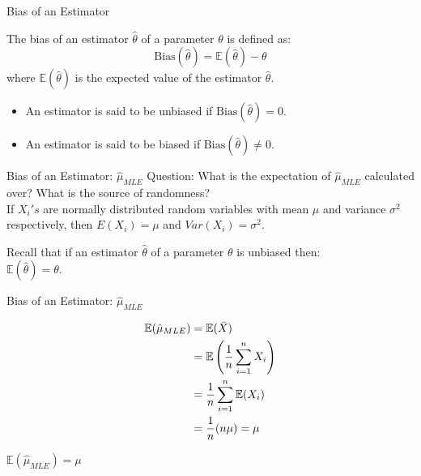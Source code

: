 \documentclass[handout]{beamer}
\begin{document}
    \begin{frame}{Bias of an Estimator}
        \begin{tcolorbox}[colback=metropolisblue!5,colframe=metropolisblue,title=Bias of an Estimator]
            The bias of an estimator $\hat{\theta}$ of a parameter $\theta$ is defined as:
            \[
                \text{Bias}(\hat{\theta}) = \mathbb{E}(\hat{\theta}) - \theta
            \]
            where $\mathbb{E}(\hat{\theta})$ is the expected value of the estimator $\hat{\theta}$.
        \end{tcolorbox}
        \begin{itemize}
            \item An estimator is said to be unbiased if $\text{Bias}(\hat{\theta}) = 0$.
            \item An estimator is said to be biased if $\text{Bias}(\hat{\theta}) \neq 0$.
        \end{itemize}
        
    \end{frame}
    

    \begin{frame}{Bias of an Estimator: $\hat{\mu}_{MLE}$}
        \pause 
        Question: What is the expectation of $\hat{\mu}_{MLE}$ calculated over? What is the source of randomness? \\
        If $X_i's$ are normally distributed random variables with mean $\mu$ and variance $\sigma^2 $ respectively, then $E(X_i) = \mu$ and $Var(X_i)=\sigma^2.$

        Recall that if an estimator $\hat{\theta}$ of a parameter $\theta$ is unbiased then:\\
        $\mathbb{E}(\hat{\theta})=\theta.$
    
        
    \end{frame}
    
    \begin{frame}{Bias of an Estimator: $\hat{\mu}_{MLE}$}
        
        \begin{align*}
            \mathbb{E}(\hat{\mu}_{MLE}) &= \mathbb{E}(\Bar{X}) \\
            &=\mathbb{E}\left(\frac{1}{n}\sum_{i=1}^nX_i\right) \\
            &=\frac{1}{n}\sum_{i=1}^n\mathbb{E}(X_i) \\
            &=\frac{1}{n}(n\mu) = \mu
        \end{align*}
        
        
        \begin{tcolorbox}[colback=metropolisblue!5,colframe=metropolisblue,title= Estimator $\hat{\mu}_{MLE}$ is unbiased]
            $\mathbb{E}(\hat{\mu}_{MLE}) = \mu$
        \end{tcolorbox}

        
    \end{frame}
\end{document}
